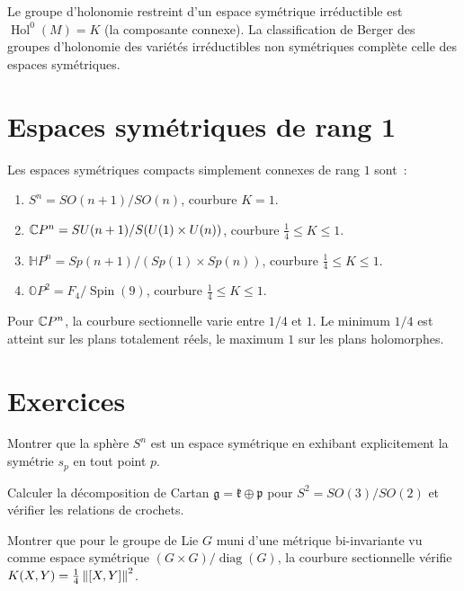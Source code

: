 \begin{theoreme}[Holonomie]
Le groupe d'holonomie restreint d'un espace sym\'etrique irr\'eductible est
$\operatorname{Hol}^0(M) = K$ (la composante connexe). La classification de
Berger des groupes d'holonomie des vari\'et\'es irr\'eductibles non sym\'etriques
compl\`ete celle des espaces sym\'etriques.
\end{theoreme}

\section{Espaces sym\'etriques de rang 1}

Les espaces sym\'etriques compacts simplement connexes de rang $1$ sont~:
\begin{enumerate}
    \item $S^n = SO(n+1)/SO(n)$, courbure $K = 1$.
    \item $\mathbb{C} P^n = SU(n+1)/S(U(1) \times U(n))$, courbure $\frac{1}{4} \leq K \leq 1$.
    \item $\mathbb{H}P^n = Sp(n+1)/(Sp(1) \times Sp(n))$, courbure $\frac{1}{4} \leq K \leq 1$.
    \item $\mathbb{O}P^2 = F_4/\operatorname{Spin}(9)$, courbure $\frac{1}{4} \leq K \leq 1$.
\end{enumerate}

\begin{remarque}
Pour $\mathbb{C} P^n$, la courbure sectionnelle varie entre $1/4$ et $1$. Le minimum
$1/4$ est atteint sur les plans totalement r\'eels, le maximum $1$ sur les plans
holomorphes.
\end{remarque}

\section{Exercices}

\begin{exercice}
Montrer que la sph\`ere $S^n$ est un espace sym\'etrique en exhibant explicitement
la sym\'etrie $s_p$ en tout point $p$.
\end{exercice}

\begin{exercice}
Calculer la d\'ecomposition de Cartan $\mathfrak{g} = \mathfrak{k} \oplus \mathfrak{p}$
pour $S^2 = SO(3)/SO(2)$ et v\'erifier les relations de crochets.
\end{exercice}

\begin{exercice}
Montrer que pour le groupe de Lie $G$ muni d'une m\'etrique bi-invariante vu comme
espace sym\'etrique $(G \times G)/\operatorname{diag}(G)$, la courbure sectionnelle
v\'erifie $K(X,Y) = \frac{1}{4}\left\| [X,Y] \right\|^2$.
\end{exercice}

